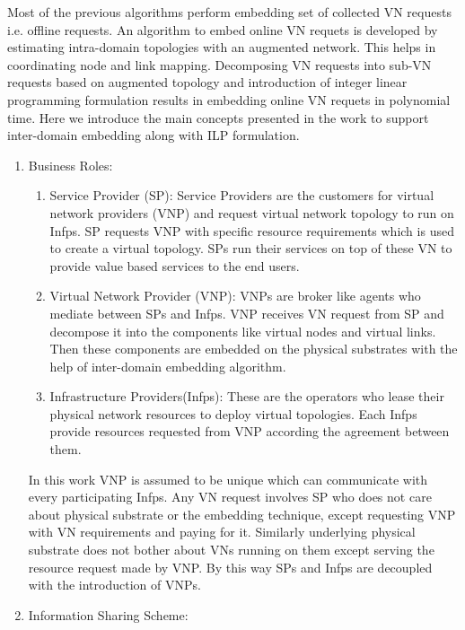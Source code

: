 \documentclass[article,dr=phil,type=msc ,colorback,accentcolor=tud4b]{tudthesis}
\begin{document}
Most of the previous algorithms perform embedding set of collected VN requests i.e. offline requests. An algorithm to embed online VN requets is developed by  estimating intra-domain topologies with an augmented network. This helps in coordinating node and link mapping. Decomposing VN requests into sub-VN requests based on augmented topology and introduction of integer linear programming formulation results in embedding online VN requets in polynomial time. Here we introduce the main concepts presented in the work \cite{6914301} to support inter-domain embedding along with ILP formulation.

\begin{enumerate}[label=(\Alph*)]
\item Business Roles: 

\begin{enumerate}
\item Service Provider (SP): Service Providers are the customers for virtual network providers (VNP) and request virtual network topology to run on Infps. SP requests VNP with specific resource requirements which is used to create a virtual topology. SPs run their services on top of these VN to provide value based services to the end users.

\item Virtual Network Provider (VNP): VNPs are broker like agents who mediate between SPs and Infps. VNP receives VN request from SP and decompose it into the components like virtual nodes and virtual links. Then these components are embedded on the physical substrates with the help of inter-domain embedding algorithm. 

\item Infrastructure Providers(Infps): These are the operators who lease their physical network resources to deploy virtual topologies. Each Infps provide resources requested from VNP according the agreement between them.
\end{enumerate}	
In this work VNP is assumed to be unique which can communicate with every participating Infps. Any VN request involves SP who does not care about physical substrate or the embedding technique, except requesting VNP with VN requirements and paying for it. Similarly underlying physical substrate does not bother about VNs running on them except serving the resource request made by VNP. By this way SPs and Infps are decoupled with the introduction of VNPs.
	
\item Information Sharing Scheme:


\end{enumerate}
\end{document}
